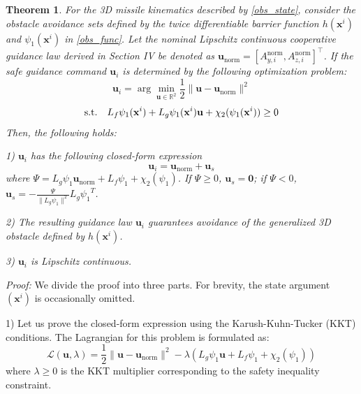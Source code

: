\documentclass[lettersize,journal]{IEEEtran}
\newtheorem{theorem}{Theorem}
\begin{document}
\begin{theorem}
	For the 3D missile kinematics described by \eqref{obs_state}, consider the obstacle avoidance sets defined by the twice differentiable barrier function $h(\mathbf{x}^i)$ and ${\psi _1}(\mathbf{x}^i)$ in \eqref{obs_func}. Let the nominal Lipschitz continuous cooperative guidance law derived in Section IV be denoted as $\mathbf{u}_{\mathrm{norm}} = [A_{y,i}^{\mathrm{norm}}, A_{z,i}^{\mathrm{norm}}]^\top$. If the safe guidance command $\mathbf{u}_i$ is determined by the following optimization problem:
	\begin{equation}
		\mathbf{u}_i = \arg \min_{\mathbf{u} \in \mathbb{R}^2} \frac{1}{2} \| \mathbf{u} - \mathbf{u}_{\mathrm{norm}} \|^2 \nonumber
	\end{equation}
	\begin{equation}
		\label{constraints}
		{\rm{s.t.}} \quad  L_{{f}}{\psi _1}(\mathbf{x}^i) + L_{{g}}{\psi _1}(\mathbf{x}^i){\mathbf{u}} + {\chi _2}({\psi _1}(\mathbf{x}^i)) \ge 0
	\end{equation}
	Then, the following holds:
	
	1) $\mathbf{u}_i$ has the following closed-form expression
	\begin{equation}
		\label{ai_as}
		\mathbf{u}_i = \mathbf{u}_{\mathrm{norm}} + \mathbf{u}_s
	\end{equation}
	where $\Psi = L_{{g}}{\psi _1} \mathbf{u}_{\mathrm{norm}} + L_{{f}}{\psi _1} + {\chi _2}({\psi _1})$. If $\Psi \ge 0$, $\mathbf{u}_s = \mathbf{0}$; if $\Psi < 0$, $\mathbf{u}_s = -\frac{\Psi}{\|L_{g}{\psi _1}\|^2} L_{g}{\psi _1}^T$.
	
	2) The resulting guidance law $\mathbf{u}_i$ guarantees avoidance of the generalized 3D obstacle defined by $h(\mathbf{x}^i)$.
	
	3) $\mathbf{u}_i$ is Lipschitz continuous.
\end{theorem}

\textit{Proof:} We divide the proof into three parts. For brevity, the state argument $(\mathbf{x}^i)$ is occasionally omitted.

1) Let us prove the closed-form expression using the Karush-Kuhn-Tucker (KKT) conditions. The Lagrangian for this problem is formulated as:
\begin{equation}
	\mathcal{L}(\mathbf{u}, \lambda) = \frac{1}{2} \| \mathbf{u} - \mathbf{u}_{\mathrm{norm}} \|^2 - \lambda \left(L_{{g}}{\psi _1} {\mathbf{u}} + L_{{f}}{\psi _1} + {\chi _2}({\psi _1}) \right) 
\end{equation}
where $\lambda \ge 0$ is the KKT multiplier corresponding to the safety inequality constraint. 
\end{document}
